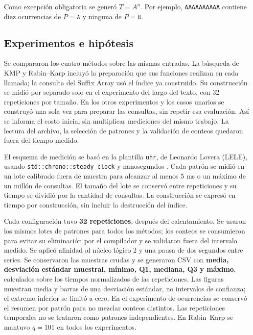 Como excepción obligatoria se generó \(T=A^n\). Por ejemplo,
\texttt{AAAAAAAAAA} contiene diez ocurrencias de \(P=\texttt{A}\) y ninguna de
\(P=\texttt{B}\).

\subsection{Experimentos e hipótesis}

Se compararon los cuatro métodos sobre las mismas entradas. La búsqueda de KMP
y Rabin--Karp incluyó la preparación que sus funciones realizan en cada llamada;
la consulta del Suffix Array usó el índice ya construido. Su construcción se
midió por separado solo en el experimento del largo del texto, con 32
repeticiones por tamaño. En los otros experimentos y los casos unarios se
construyó una sola vez para preparar las consultas, sin repetir esa evaluación.
Así se informa el costo inicial sin multiplicar mediciones del mismo trabajo.
La lectura del archivo, la selección de patrones y la validación de conteos
quedaron fuera del tiempo medido.

El esquema de medición se basó en la plantilla \texttt{uhr}, de Leonardo
Lovera (LELE), usando \texttt{std::chrono::steady\_clock} y nanosegundos
\cite{lovera-uhr}. Cada patrón se midió en un lote calibrado fuera de muestra
para alcanzar al menos 5 ms o un máximo de un millón de consultas. El tamaño
del lote se conservó entre repeticiones y su tiempo se dividió por la
cantidad de consultas. La construcción se expresó en tiempo por construcción,
sin incluir la destrucción del índice.

Cada configuración tuvo \textbf{32 repeticiones}, después del calentamiento.
Se usaron los mismos lotes de patrones para todos los métodos; los conteos se
consumieron para evitar su eliminación por el compilador y se validaron fuera
del intervalo medido. Se aplicó afinidad al núcleo lógico 2 y una pausa de
dos segundos entre series. Se conservaron las muestras crudas y se generaron
CSV con \textbf{media, desviación estándar muestral, mínimo, Q1, mediana, Q3 y
máximo}, calculados sobre los tiempos normalizados de las repeticiones. Las
figuras muestran media y barras de una desviación estándar, no intervalos de
confianza; el extremo inferior se limitó a cero. En el experimento de
ocurrencias se conservó el resumen por patrón para no mezclar conteos
distintos. Las repeticiones temporales no se trataron como patrones independientes.
En Rabin--Karp se mantuvo \(q=101\) en todos los experimentos.

